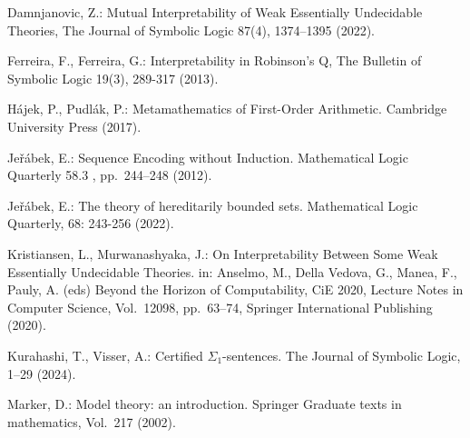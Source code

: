 \documentclass[10pt,a4paper, openany,  oldfontcommands]{memoir}
\newtheorem{open problem} [theorem] {Open Problem}
\newtheorem{open question} [theorem] {Open Question}
\begin{document}
\begin{thebibliography}{}





Damnjanovic,  Z.:   Mutual Interpretability of Weak Essentially Undecidable Theories,   
The Journal of Symbolic Logic  87(4),  1374–1395   (2022).








Ferreira, F.,  Ferreira, G.:   Interpretability in Robinson's Q,  The Bulletin of Symbolic Logic  19(3), 289-317   (2013).













Hájek, P.,  Pudlák, P.: Metamathematics of First-Order Arithmetic. Cambridge University Press (2017).








Jeřábek, E.: Sequence Encoding without Induction.
 Mathematical Logic Quarterly 58.3 , pp.~244–248  (2012). 




Jeřábek, E.: The theory of hereditarily bounded sets. Mathematical  Logic  Quarterly, 68: 243-256 (2022). 




 Kristiansen,  L.,  Murwanashyaka, J.:  On Interpretability Between Some Weak Essentially Undecidable Theories. 
 in: Anselmo, M., Della Vedova, G., Manea, F., Pauly, A. (eds) Beyond the Horizon of Computability,  CiE 2020,   Lecture Notes in Computer Science,  Vol.~12098,  pp.~63–74,    Springer International Publishing (2020).






Kurahashi, T.,  Visser, A.: Certified $ \Sigma _1$-sentences. The Journal of Symbolic Logic, 1–29 (2024).



Marker, D.: Model theory: an introduction.  Springer Graduate texts in mathematics, Vol.~217 (2002).










\end{thebibliography}
\end{document}
